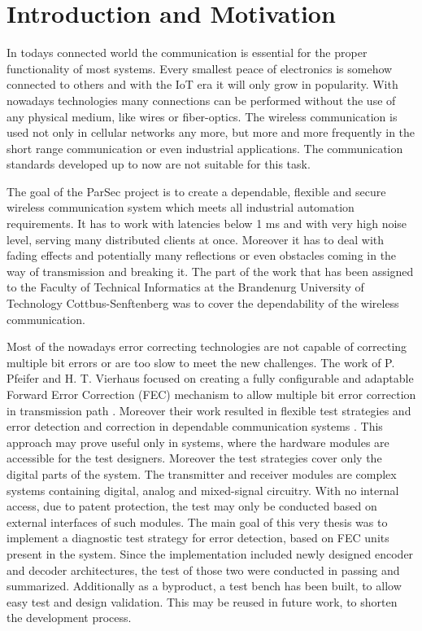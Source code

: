 \chapter{Introduction and Motivation} \label{ch:int}
In todays connected world the communication is essential for the proper functionality of most systems. Every smallest peace of electronics is somehow connected to others and with the IoT era it will only grow in popularity. With nowadays technologies many connections can be performed without the use of any physical medium, like wires or fiber-optics. The wireless communication is used not only in cellular networks any more, but more and more frequently in the short range communication or even industrial applications. The communication standards developed up to now are not suitable for this task.

The goal of the ParSec project is to create a dependable, flexible and secure wireless communication system which meets all industrial automation requirements. It has to work with latencies below 1 ms and with very high noise level, serving many distributed clients at once. Moreover it has to deal with fading effects and potentially many reflections or even obstacles coming in the way of transmission and breaking it. The part of the work that has been assigned to the Faculty of Technical Informatics at the Brandenurg University of Technology Cottbus-Senftenberg was to cover the dependability of the wireless communication.

Most of the nowadays error correcting technologies are not capable of correcting multiple bit errors or are too slow to meet the new challenges. The work of P. Pfeifer and H. T. Vierhaus focused on creating a fully configurable and adaptable Forward Error Correction (FEC) mechanism to allow multiple bit error correction in transmission path \cite{art:Pfeifer}. Moreover their work resulted in flexible test strategies and error detection and correction in dependable communication systems \cite{art:Gleichner}. This approach may prove useful only in systems, where the hardware modules are accessible for the test designers. Moreover the test strategies cover only the digital parts of the system. The transmitter and receiver modules are complex systems containing digital, analog and mixed-signal circuitry. With no internal access, due to patent protection, the test may only be conducted based on external interfaces of such modules. The main goal of this very thesis was to implement a diagnostic test strategy for error detection, based on FEC units present in the system. Since the implementation included newly designed encoder and decoder architectures, the test of those two were conducted in passing and summarized. Additionally as a byproduct, a test bench has been built, to allow easy test and design validation. This may be reused in future work, to shorten the development process.

